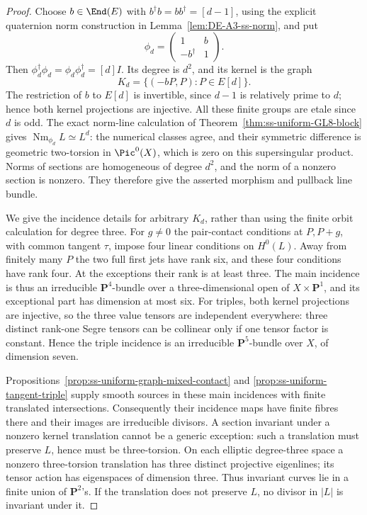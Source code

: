 \begin{proof}
Choose $b\in\End(E)$ with $b^\dagger b=bb^\dagger=[d-1]$,
using the explicit quaternion norm construction in
Lemma~\ref{lem:DE-A3-ss-norm}, and put
\[
 \phi_d=\begin{pmatrix}1&b\\-b^\dagger&1\end{pmatrix}.
\]
Then $\phi_d^\dagger\phi_d=\phi_d\phi_d^\dagger=[d]I$.
Its degree is $d^2$, and its kernel is the graph
\[
 K_d=\{(-bP,P):P\in E[d]\}.
\]
The restriction of $b$ to $E[d]$ is invertible, since
$d-1$ is relatively prime to $d$; hence both kernel projections
are injective. All these finite groups are etale since $d$ is odd.
The exact norm-line calculation of
Theorem~\ref{thm:ss-uniform-GL8-block} gives
$\operatorname{Nm}_{\phi_d}L\simeq L^d$:
the numerical classes agree, and their symmetric difference is
geometric two-torsion in $\Pic^0(X)$, which is zero on this
supersingular product. Norms of sections are homogeneous of degree
$d^2$, and the norm of a nonzero section is nonzero. They therefore
give the asserted morphism and pullback line bundle.

We give the incidence details for arbitrary $K_d$, rather than
using the finite orbit calculation for degree three.
For $g\ne0$ the pair-contact conditions at $P,P+g$, with common
tangent $\tau$, impose four linear conditions on $H^0(L)$.
Away from finitely many $P$ the two full first jets have rank six,
and these four conditions have rank four. At the exceptions their
rank is at least three. The main incidence is thus an irreducible
$\mathbf P^4$-bundle over a three-dimensional open of
$X\times\mathbf P^1$, and its exceptional part has dimension at
most six. For triples, both kernel projections are injective, so
the three value tensors are independent everywhere: three distinct
rank-one Segre tensors can be collinear only if one tensor factor
is constant. Hence the triple incidence is an irreducible
$\mathbf P^5$-bundle over $X$, of dimension seven.

Propositions~\ref{prop:ss-uniform-graph-mixed-contact} and
\ref{prop:ss-uniform-tangent-triple} supply smooth sources in
these main incidences with finite translated intersections.
Consequently their incidence maps have finite fibres there and
their images are irreducible divisors. A section invariant under
a nonzero kernel translation cannot be a generic exception: such
a translation must preserve $L$, hence must be three-torsion.
On each elliptic degree-three space a nonzero three-torsion
translation has three distinct projective eigenlines; its tensor
action has eigenspaces of dimension three. Thus invariant curves
lie in a finite union of $\mathbf P^2$'s. If the translation does
not preserve $L$, no divisor in $|L|$ is invariant under it.


\end{proof}
